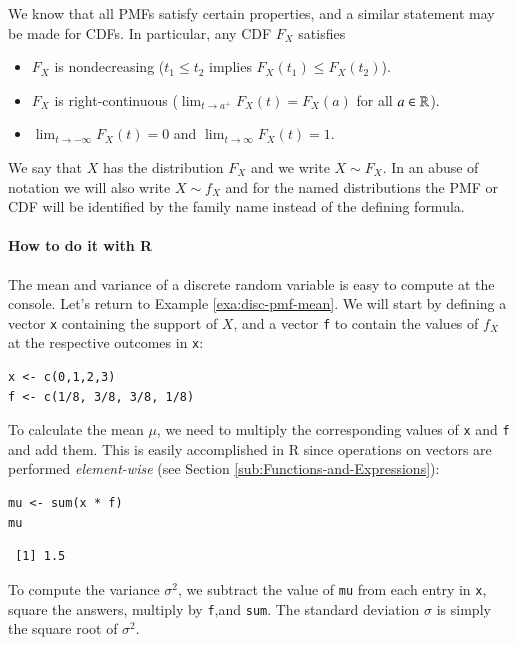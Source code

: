 \documentclass[captions=tableheading]{scrbook}
\begin{document}
We know that all PMFs satisfy certain properties, and a similar statement may be made for CDFs. In particular, any CDF \(F_{X}\) satisfies

\begin{itemize}
\item \(F_{X}\) is nondecreasing (\(t_{1}\leq t_{2}\) implies \(F_{X}(t_{1})\leq F_{X}(t_{2})\)).
\item \(F_{X}\) is right-continuous (\(\lim_{t\to a^{+}}F_{X}(t)=F_{X}(a)\) for all \(a\in\mathbb{R}\)).
\item \(\lim_{t\to-\infty}F_{X}(t)=0\) and \(\lim_{t\to\infty}F_{X}(t)=1\).
\end{itemize}


We say that \(X\) has the distribution \(F_{X}\) and we write \(X\sim F_{X}\). In an abuse of notation we will also write \(X\sim f_{X}\) and for the named distributions the PMF or CDF will be identified by the family name instead of the defining formula.

\paragraph*{How to do it with \textsf{R}}
\label{sub:disc-rv-how-r}

The mean and variance of a discrete random variable is easy to compute at the console. Let's return to Example \ref{exa:disc-pmf-mean}. We will start by defining a vector \texttt{x} containing the support of \(X\), and a vector \texttt{f} to contain the values of \(f_{X}\) at the respective outcomes in \texttt{x}:


\begin{verbatim}
x <- c(0,1,2,3)
f <- c(1/8, 3/8, 3/8, 1/8)
\end{verbatim}

To calculate the mean \(\mu\), we need to multiply the corresponding values of \texttt{x} and \texttt{f} and add them. This is easily accomplished in \textsf{R} since operations on vectors are performed \emph{element-wise} (see Section \ref{sub:Functions-and-Expressions}): 


\begin{verbatim}
mu <- sum(x * f)
mu
\end{verbatim}

\begin{verbatim}
 [1] 1.5
\end{verbatim}

To compute the variance \(\sigma^{2}\), we subtract the value of \texttt{mu} from each entry in \texttt{x}, square the answers, multiply by \texttt{f},and \texttt{sum}. The standard deviation \(\sigma\) is simply the square root of \(\sigma^{2}\).
\end{document}

